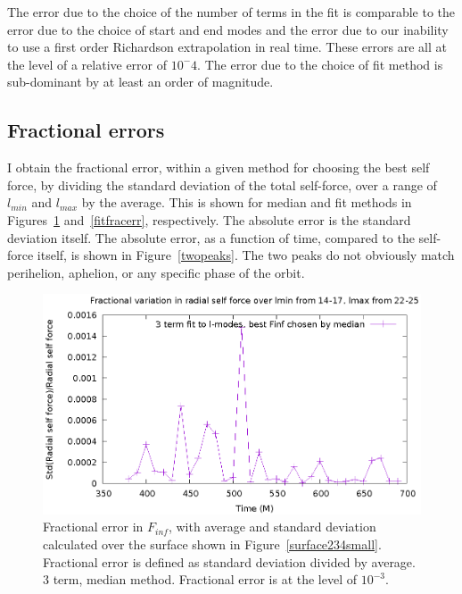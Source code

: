 The error due to the choice of the number of terms in the fit is comparable to the error due to the choice of start and end modes and the error due to our inability to use a first order Richardson extrapolation in real time. These errors are all at the level of a relative error of $10^-4$. The error due to the choice of fit method is sub-dominant by at least an order of magnitude. 




\subsection{Fractional errors}


I obtain the fractional error, within a given method for choosing the best self force, by dividing the standard deviation of the total self-force, over a range of $l_{min}$ and $l_{max}$ by the average. This is shown for median and fit methods in Figures~\ref{medfracerr} and~\ref{fitfracerr}, respectively. The absolute error is the standard deviation itself. The absolute error, as a function of time, compared to the self-force itself, is shown in Figure~\ref{twopeaks}. The two peaks do not obviously match perihelion, aphelion, or any specific phase of the orbit. 


\begin{figure}
  \includegraphics{fractionalErrorSelfForceOverTime3termMedian}
  \caption{Fractional error in $F_{inf}$, with average and standard deviation calculated over the surface shown in Figure~\ref{surface234small}. Fractional error is defined as standard deviation divided by average. 3 term, median method. Fractional error is at the level of $10^{-3}$.}
  \label{medfracerr}
\end{figure}

